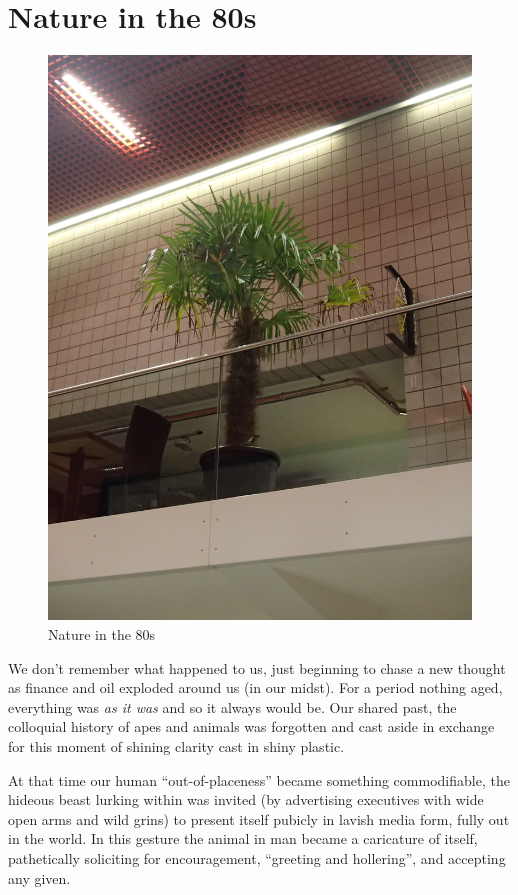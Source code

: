 \documentclass{book}
\begin{document}
\chapter{Nature in the 80s}

\begin{figure}
\centering
\includegraphics[width=\textwidth,angle=-90]{figures/P1050152.JPG}
\caption{Nature in the 80s}
\end{figure}

We don't remember what happened to us, just beginning to chase a new thought as
finance and oil exploded around us (in our midst). For a period nothing aged,
everything was \emph{as it was} and so it always would be. Our shared past, the
colloquial history of apes and animals was forgotten and cast aside in exchange
for this moment of shining clarity cast in shiny plastic.

At that time our human ``out-of-placeness'' became something commodifiable, the
hideous beast lurking within was invited (by advertising executives with wide
open arms and wild grins) to present itself pubicly in lavish media form, fully
out in the world. In this gesture the animal in man became a caricature of
itself, pathetically soliciting for encouragement, ``greeting and hollering'',
and accepting any given.
\end{document}
